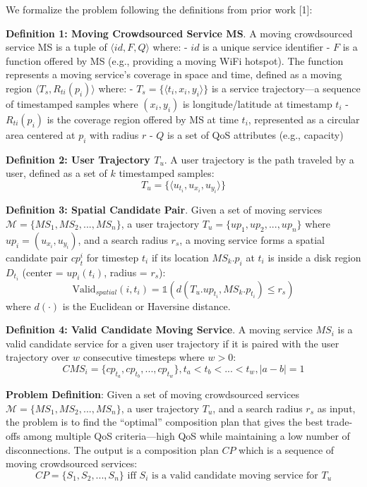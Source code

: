 \documentclass[
  10pt,
  twocolumn,
]{article}
\begin{document}
We formalize the problem following the definitions from prior work
{[}1{]}:

\textbf{Definition 1: Moving Crowdsourced Service MS}. A moving
crowdsourced service MS is a tuple of \(\langle id, F, Q \rangle\)
where: - \(id\) is a unique service identifier - \(F\) is a function
offered by MS (e.g., providing a moving WiFi hotspot). The function
represents a moving service's coverage in space and time, defined as a
moving region \(\langle T_s, R_{ti}(p_i) \rangle\) where: -
\(T_s = \{\langle t_i, x_i, y_i \rangle\}\) is a service trajectory---a
sequence of timestamped samples where \((x_i, y_i)\) is
longitude/latitude at timestamp \(t_i\) - \(R_{ti}(p_i)\) is the
coverage region offered by MS at time \(t_i\), represented as a circular
area centered at \(p_i\) with radius \(r\) - \(Q\) is a set of QoS
attributes (e.g., capacity)

\textbf{Definition 2: User Trajectory \(T_u\)}. A user trajectory is the
path traveled by a user, defined as a set of \(k\) timestamped samples:
\[T_u = \{\langle u_{t_i}, u_{x_i}, u_{y_i} \rangle\}\]

\textbf{Definition 3: Spatial Candidate Pair}. Given a set of moving
services \(\mathcal{M} = \{MS_1, MS_2, ..., MS_n\}\), a user trajectory
\(T_u = \{up_1, up_2, ..., up_n\}\) where \(up_i = (u_{x_i}, u_{y_i})\),
and a search radius \(r_s\), a moving service forms a spatial candidate
pair \(cp_t^i\) for timestep \(t_i\) if its location \(MS_k.p_i\) at
\(t_i\) is inside a disk region \(D_{t_i}\) (center = \(up_i(t_i)\),
radius = \(r_s\)):
\[\text{Valid}_{spatial}(i, t_i) = \mathbb{1}(d(T_u.up_{t_i}, MS_k.p_{t_i}) \leq r_s)\]
where \(d(\cdot)\) is the Euclidean or Haversine distance.

\textbf{Definition 4: Valid Candidate Moving Service}. A moving service
\(MS_i\) is a valid candidate service for a given user trajectory if it
is paired with the user trajectory over \(w\) consecutive timesteps
where \(w > 0\):
\[CMS_i = \{cp_{t_a}, cp_{t_b}, ..., cp_{t_w}\}, t_a < t_b < ... < t_w, |a - b| = 1\]

\textbf{Problem Definition}: Given a set of moving crowdsourced services
\(\mathcal{M} = \{MS_1, MS_2, ..., MS_n\}\), a user trajectory \(T_u\),
and a search radius \(r_s\) as input, the problem is to find the
``optimal'' composition plan that gives the best trade-offs among
multiple QoS criteria---high QoS while maintaining a low number of
disconnections. The output is a composition plan \(CP\) which is a
sequence of moving crowdsourced services:
\[CP = \{S_1, S_2, ..., S_n\} \text{ iff } S_i \text{ is a valid candidate moving service for } T_u\]
\end{document}

